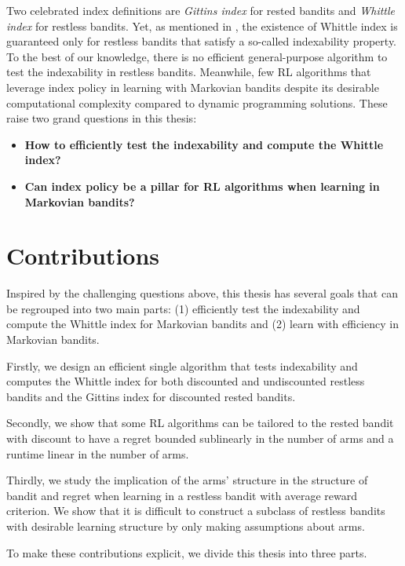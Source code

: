 Two celebrated index definitions are \emph{Gittins index} \cite{gittins1979bandit} for rested bandits and \emph{Whittle index} \cite{whittle1988restless} for restless bandits.
Yet, as mentioned in \cite[Chapter~14]{whittle1996optimal}, the existence of Whittle index is guaranteed only for restless bandits that satisfy a so-called indexability property.
To the best of our knowledge, there is no efficient general-purpose algorithm to test the indexability in restless bandits.
Meanwhile, few RL algorithms that leverage index policy in learning with Markovian bandits despite its desirable computational complexity compared to dynamic programming solutions.
These raise two grand questions in this thesis:
\begin{itemize}
    \item {\color{myblue}\bfseries\large How to efficiently test the indexability and compute the Whittle index?}
    \item {\color{myblue}\bfseries\large Can index policy be a pillar for RL algorithms when learning in Markovian bandits?}
\end{itemize}

\section{Contributions}

Inspired by the challenging questions above, this thesis has several goals that can be regrouped into two main parts: (1) efficiently test the indexability and compute the Whittle index for Markovian bandits and (2) learn with efficiency in Markovian bandits.

Firstly, we design an efficient single algorithm that tests indexability and computes the Whittle index for both discounted and undiscounted restless bandits and the Gittins index for discounted rested bandits.

Secondly, we show that some RL algorithms can be tailored to the rested bandit with discount to have a regret bounded sublinearly in the number of arms and a runtime linear in the number of arms.

Thirdly, we study the implication of the arms' structure in the structure of bandit and regret when learning in a restless bandit with average reward criterion.
We show that it is difficult to construct a subclass of restless bandits with desirable learning structure by only making assumptions about arms.

To make these contributions explicit, we divide this thesis into three parts.

